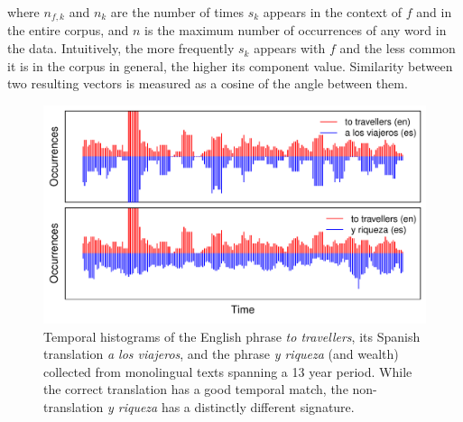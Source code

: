 \documentclass[11pt]{article}
\newcommand{\mtodo}[1]{}
\begin{document}
\noindent where $n_{f,k}$ and $n_{k}$ are the number of times $s_{k}$ appears in the context of $f$ and in the entire corpus, and $n$ is the maximum number of occurrences of any word in the data.  Intuitively, the more frequently $s_{k}$ appears with $f$ and the less common it is in the corpus in general, the higher its component value.  Similarity between two resulting vectors is measured as a cosine of the angle between them.


\begin{figure}[t]
\includegraphics[width= \linewidth]{../figures/temporal/temporal}
\caption{Temporal histograms of the English phrase {\em to travellers}, its Spanish translation {\em a los viajeros}, and the phrase {\em y riqueza} (and wealth) collected from monolingual texts spanning a 13 year period. While the correct translation has a good temporal match, the non-translation {\em y riqueza} has a distinctly different signature.}
\label{fig:temporal}
\end{figure}
\end{document}
